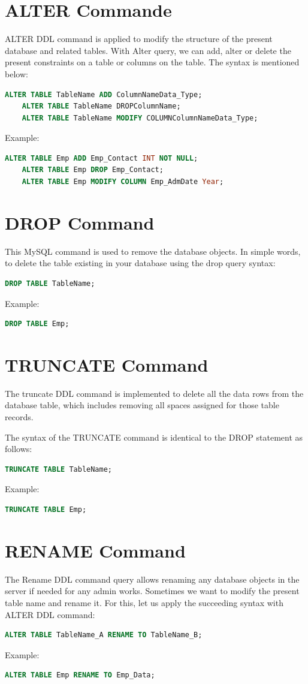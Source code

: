 \section{ALTER Commande}
ALTER DDL command is applied to modify the structure of the present database and related tables.
With Alter query, we can add, alter or delete the present constraints on a table or columns on the table. 
The syntax is mentioned below:
\begin{lstlisting}[language=sql]
	ALTER TABLE TableName ADD ColumnNameData_Type;
	ALTER TABLE TableName DROPColumnName;
	ALTER TABLE TableName MODIFY COLUMNColumnNameData_Type;	
\end{lstlisting}
Example:
\begin{lstlisting}[language=sql]
	ALTER TABLE Emp ADD Emp_Contact INT NOT NULL;
	ALTER TABLE Emp DROP Emp_Contact;
	ALTER TABLE Emp MODIFY COLUMN Emp_AdmDate Year;	
\end{lstlisting}

\section{DROP Command}
This MySQL command is used to remove the database objects. In simple words, to delete the table existing in your database using the drop query syntax:
\begin{lstlisting}[language=sql]
	DROP TABLE TableName;
\end{lstlisting}
Example:
\begin{lstlisting}[language=sql]
	DROP TABLE Emp;
\end{lstlisting}

\section{TRUNCATE Command}
The truncate DDL command is implemented to delete all the data rows from the database table, which includes removing all spaces assigned for those table records.

The syntax of the TRUNCATE command is identical to the DROP statement as follows:
\begin{lstlisting}[language=sql]
	TRUNCATE TABLE TableName;
\end{lstlisting}
Example:
\begin{lstlisting}[language=sql]
	TRUNCATE TABLE Emp;
\end{lstlisting}

\section{RENAME Command}
The Rename DDL command query allows renaming any database objects in the server if needed for any admin works. Sometimes we want to modify the present table name and rename it. For this, let us apply the succeeding syntax with ALTER DDL command:
\begin{lstlisting}[language=sql]
	ALTER TABLE TableName_A RENAME TO TableName_B;
\end{lstlisting}
Example:
\begin{lstlisting}[language=sql]
	ALTER TABLE Emp RENAME TO Emp_Data;
\end{lstlisting}


